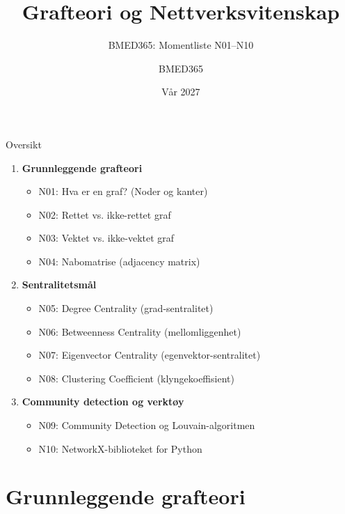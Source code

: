 \documentclass[aspectratio=169, 10pt]{beamer}
\title{Grafteori og Nettverksvitenskap}
\subtitle{BMED365: Momentliste N01--N10}
\author{BMED365}
\date{Vår 2027}
\begin{document}
\begin{frame}
    \titlepage
\end{frame}

\begin{frame}{Oversikt}
    \begin{enumerate}
        \item \textbf{Grunnleggende grafteori}
        \begin{itemize}
            \item N01: Hva er en graf? (Noder og kanter)
            \item N02: Rettet vs. ikke-rettet graf
            \item N03: Vektet vs. ikke-vektet graf
            \item N04: Nabomatrise (adjacency matrix)
        \end{itemize}
        \item \textbf{Sentralitetsmål}
        \begin{itemize}
            \item N05: Degree Centrality (grad-sentralitet)
            \item N06: Betweenness Centrality (mellomliggenhet)
            \item N07: Eigenvector Centrality (egenvektor-sentralitet)
            \item N08: Clustering Coefficient (klyngekoeffisient)
        \end{itemize}
        \item \textbf{Community detection og verktøy}
        \begin{itemize}
            \item N09: Community Detection og Louvain-algoritmen
            \item N10: NetworkX-biblioteket for Python
        \end{itemize}
    \end{enumerate}
\end{frame}

\section{Grunnleggende grafteori}
\end{document}
